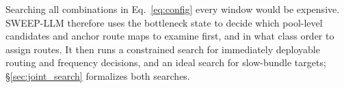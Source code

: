 Searching all combinations in Eq.~\ref{eq:config} every window would be expensive.
SWEEP-LLM therefore uses the bottleneck state to decide which pool-level candidates and anchor route maps to examine first, and in what class order to assign routes.
It then runs a constrained search for immediately deployable routing and frequency decisions, and an ideal search for slow-bundle targets; \S\ref{sec:joint_search} formalizes both searches.

